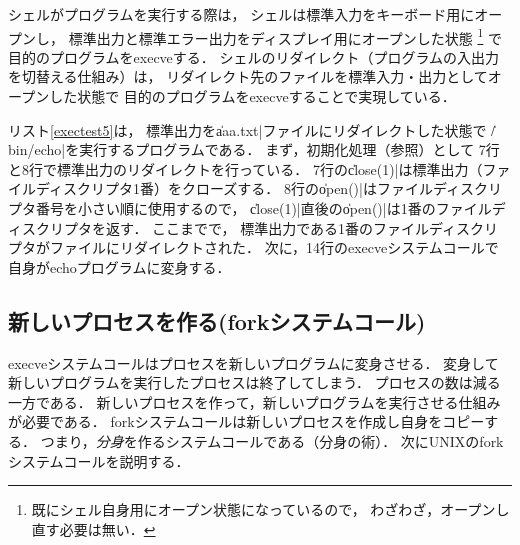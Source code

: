 シェルがプログラムを実行する際は，
シェルは標準入力をキーボード用にオープンし，
標準出力と標準エラー出力をディスプレイ用にオープンした状態
\footnote{
  既にシェル自身用にオープン状態になっているので，
  わざわざ，オープンし直す必要は無い．}
で目的のプログラムをexecveする．
シェルのリダイレクト（プログラムの入出力を切替える仕組み）は，
リダイレクト先のファイルを標準入力・出力としてオープンした状態で
目的のプログラムをexecveすることで実現している．



リスト\ref{exectest5}は，
標準出力を\|aaa.txt|ファイルにリダイレクトした状態で
\|/bin/echo|を実行するプログラムである．
まず，初期化処理（参照）として
7行と8行で標準出力のリダイレクトを行っている．
7行の\|close(1)|は標準出力（ファイルディスクリプタ1番）をクローズする．
8行の\|open()|はファイルディスクリプタ番号を小さい順に使用するので，
\|close(1)|直後の\|open()|は1番のファイルディスクリプタを返す．
ここまでで，
標準出力である1番のファイルディスクリプタがファイルにリダイレクトされた．
次に，14行のexecveシステムコールで自身がechoプログラムに変身する．

\subsection{新しいプロセスを作る(forkシステムコール)}
execveシステムコールはプロセスを新しいプログラムに変身させる．
変身して新しいプログラムを実行したプロセスは終了してしまう．
プロセスの数は減る一方である．
新しいプロセスを作って，新しいプログラムを実行させる仕組みが必要である．
forkシステムコールは新しいプロセスを作成し自身をコピーする．
つまり，\emph{分身}を作るシステムコールである（分身の術）．
次にUNIXのforkシステムコールを説明する．

